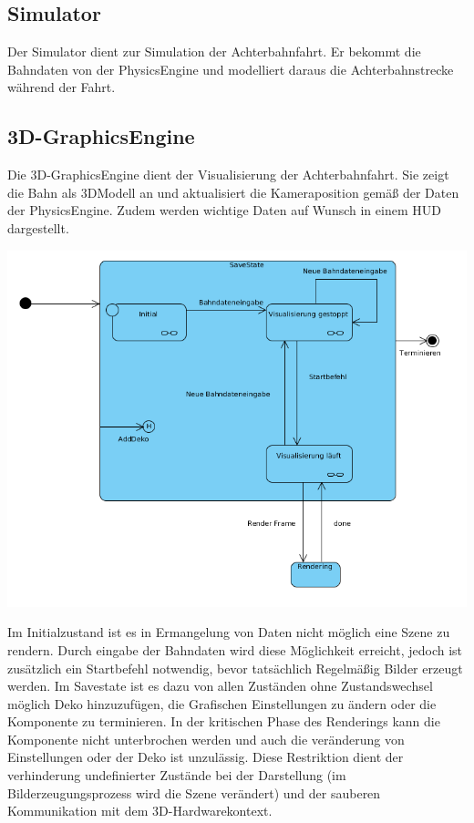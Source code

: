 \subsection{Simulator}
Der Simulator dient zur Simulation der Achterbahnfahrt. Er bekommt die Bahndaten von der PhysicsEngine und modelliert daraus die Achterbahnstrecke während der Fahrt.
\subsection{3D-GraphicsEngine}
Die 3D-GraphicsEngine dient der Visualisierung der Achterbahnfahrt. Sie zeigt die Bahn als 3DModell an und aktualisiert die Kameraposition gemäß der Daten der PhysicsEngine. 
Zudem werden wichtige Daten auf Wunsch in einem HUD dargestellt.

\includegraphics[width=16cm]{bilder/statechart_3dgraphics}

Im Initialzustand ist es in Ermangelung von Daten nicht möglich eine Szene zu rendern. Durch eingabe der Bahndaten wird diese Möglichkeit erreicht, jedoch ist zusätzlich ein Startbefehl notwendig,
bevor tatsächlich Regelmäßig Bilder erzeugt werden. Im Savestate ist es dazu von allen Zuständen ohne Zustandswechsel möglich Deko hinzuzufügen, die Grafischen Einstellungen zu ändern oder die Komponente zu terminieren.
In der kritischen Phase des Renderings kann die Komponente nicht unterbrochen werden und auch die veränderung von Einstellungen oder der Deko ist unzulässig. Diese Restriktion dient der verhinderung undefinierter
Zustände bei der Darstellung (im Bilderzeugungsprozess wird die Szene verändert)  und der sauberen Kommunikation mit dem 3D-Hardwarekontext.